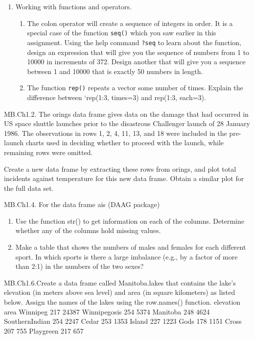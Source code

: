 \documentclass[
]{article}
\providecommand{\tightlist}{%
  \setlength{\itemsep}{0pt}\setlength{\parskip}{0pt}}
\begin{document}
\begin{enumerate}
\def\labelenumi{\arabic{enumi}.}
\setcounter{enumi}{2}
\tightlist
\item
  Working with functions and operators.

  \begin{enumerate}
  \def\labelenumii{\alph{enumii}.}
  \tightlist
  \item
    The colon operator will create a sequence of integers in order. It
    is a special case of the function \texttt{seq()} which you saw
    earlier in this assignment. Using the help command \texttt{?seq} to
    learn about the function, design an expression that will give you
    the sequence of numbers from 1 to 10000 in increments of 372. Design
    another that will give you a sequence between 1 and 10000 that is
    exactly 50 numbers in length.
  \item
    The function \texttt{rep()} repeats a vector some number of times.
    Explain the difference between `rep(1:3, times=3) and rep(1:3,
    each=3).
  \end{enumerate}
\end{enumerate}

MB.Ch1.2. The orings data frame gives data on the damage that had
occurred in US space shuttle launches prior to the disastrous Challenger
launch of 28 January 1986. The observations in rows 1, 2, 4, 11, 13, and
18 were included in the pre-launch charts used in deciding whether to
proceed with the launch, while remaining rows were omitted.

Create a new data frame by extracting these rows from orings, and plot
total incidents against temperature for this new data frame. Obtain a
similar plot for the full data set.

MB.Ch1.4. For the data frame ais (DAAG package)

\begin{enumerate}
\def\labelenumi{(\alph{enumi})}
\item
  Use the function str() to get information on each of the columns.
  Determine whether any of the columns hold missing values.
\item
  Make a table that shows the numbers of males and females for each
  different sport. In which sports is there a large imbalance (e.g., by
  a factor of more than 2:1) in the numbers of the two sexes?
\end{enumerate}

MB.Ch1.6.Create a data frame called Manitoba.lakes that contains the
lake's elevation (in meters above sea level) and area (in square
kilometers) as listed below. Assign the names of the lakes using the
row.names() function. elevation area Winnipeg 217 24387 Winnipegosis 254
5374 Manitoba 248 4624 SouthernIndian 254 2247 Cedar 253 1353 Island 227
1223 Gods 178 1151 Cross 207 755 Playgreen 217 657
\end{document}
